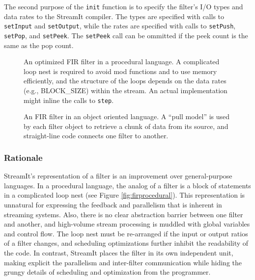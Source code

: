 The second purpose of the {\tt init} function is to specify the
filter's I/O types and data rates to the StreamIt compiler.  The types
are specified with calls to {\tt setInput} and {\tt setOutput}, while
the rates are specified with calls to {\tt setPush}, {\tt setPop}, and
{\tt setPeek}.  The {\tt setPeek} call can be ommitted if the peek
count is the same as the pop count.

\begin{figure}[t]
\vspace{-6pt}
\begin{minipage}{2.4in}
\vspace{-12pt}
\caption{\protect\small An optimized FIR filter in a procedural
   language.  A complicated loop nest is required to avoid mod
   functions and to use memory efficiently, and the structure of the
   loops depends on the data rates (e.g., BLOCK\_SIZE) within the
   stream.  An actual implementation might inline the calls to {\tt step}.
\protect\label{fig:firprocedural}}
\end{minipage}
\hspace{0.3in}
\vspace{-12pt}
\begin{minipage}{2in}
\caption{\protect\small An FIR filter in an object oriented language.
A ``pull model'' is used by each filter object to retrieve a chunk of
data from its source, and straight-line code connects one filter to
another.
\protect\label{fig:firobject}}
\end{minipage}
\vspace{-6pt}
\end{figure}

\subsubsection{Rationale}
\label{sec:oo-rat}

StreamIt's representation of a filter is an improvement over
general-purpose languages.  In a procedural language, the analog of a
filter is a block of statements in a complicated loop nest (see Figure
\ref{fig:firprocedural}).  This representation is unnatural for expressing
the feedback and parallelism that is inherent in streaming systems.
Also, there is no clear abstraction barrier between one filter and
another, and high-volume stream processing is muddled with global
variables and control flow.  The loop nest must be re-arranged if the
input or output ratios of a filter changes, and scheduling
optimizations further inhibit the readability of the code.  In
contrast, StreamIt places the filter in its own independent unit,
making explicit the parallelism and inter-filter communication while
hiding the grungy details of scheduling and optimization from the
programmer.

